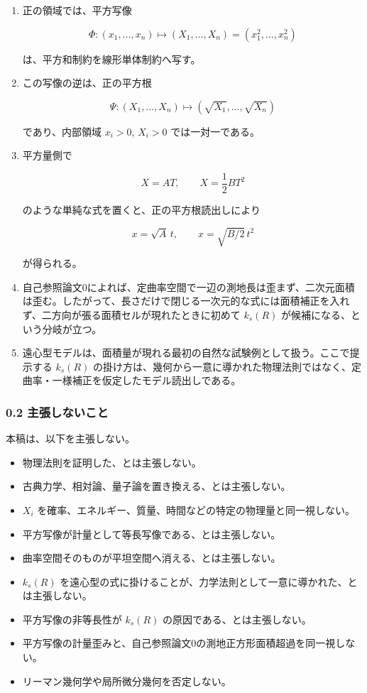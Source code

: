 \documentclass[
]{ltjsarticle}
\providecommand{\tightlist}{%
  \setlength{\itemsep}{0pt}\setlength{\parskip}{0pt}}
\begin{document}
\begin{enumerate}
\def\labelenumi{\arabic{enumi}.}
\item
  正の領域では、平方写像

  \[
  \Phi:(x_1,\ldots,x_n)\mapsto (X_1,\ldots,X_n)=(x_1^2,\ldots,x_n^2)
  \]

  は、平方和制約を線形単体制約へ写す。
\item
  この写像の逆は、正の平方根

  \[
  \Psi:(X_1,\ldots,X_n)\mapsto (\sqrt{X_1},\ldots,\sqrt{X_n})
  \]

  であり、内部領域 \(x_i>0\), \(X_i>0\) では一対一である。
\item
  平方量側で

  \[
  X=A T,\qquad X=\frac{1}{2} B T^2
  \]

  のような単純な式を置くと、正の平方根読出しにより

  \[
  x=\sqrt{A}\,t,\qquad x=\sqrt{B/2}\,t^2
  \]

  が得られる。
\item
  自己参照論文0によれば、定曲率空間で一辺の測地長は歪まず、二次元面積は歪む。したがって、長さだけで閉じる一次元的な式には面積補正を入れず、二方向が張る面積セルが現れたときに初めて
  \(k_s(R)\) が候補になる、という分岐が立つ。
\item
  遠心型モデルは、面積量が現れる最初の自然な試験例として扱う。ここで提示する
  \(k_s(R)\)
  の掛け方は、幾何から一意に導かれた物理法則ではなく、定曲率・一様補正を仮定したモデル読出しである。
\end{enumerate}

\subsubsection{0.2
主張しないこと}\label{ux4e3bux5f35ux3057ux306aux3044ux3053ux3068}

本稿は、以下を主張しない。

\begin{itemize}
\tightlist
\item
  物理法則を証明した、とは主張しない。
\item
  古典力学、相対論、量子論を置き換える、とは主張しない。
\item
  \(X_i\)
  を確率、エネルギー、質量、時間などの特定の物理量と同一視しない。
\item
  平方写像が計量として等長写像である、とは主張しない。
\item
  曲率空間そのものが平坦空間へ消える、とは主張しない。
\item
  \(k_s(R)\)
  を遠心型の式に掛けることが、力学法則として一意に導かれた、とは主張しない。
\item
  平方写像の非等長性が \(k_s(R)\) の原因である、とは主張しない。
\item
  平方写像の計量歪みと、自己参照論文0の測地正方形面積超過を同一視しない。
\item
  リーマン幾何学や局所微分幾何を否定しない。
\end{itemize}
\end{document}
